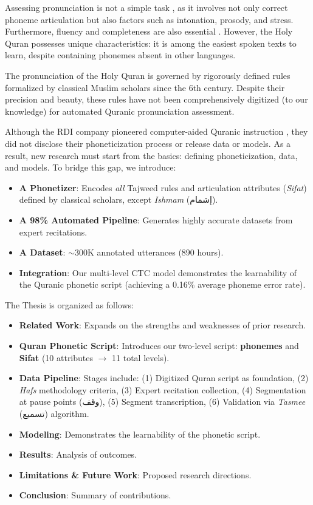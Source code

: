 Assessing pronunciation is not a simple task \cite{kheir2023automatic}, as it involves not only correct phoneme articulation but also factors such as intonation, prosody, and stress. Furthermore, fluency and completeness are also essential \cite{kheir2023automatic}. However, the Holy Quran possesses unique characteristics: it is among the easiest spoken texts to learn, despite containing phonemes absent in other languages.

The pronunciation of the Holy Quran is governed by rigorously defined rules formalized by classical Muslim scholars since the 6th century. Despite their precision and beauty, these rules have not been comprehensively digitized (to our knowledge) for automated Quranic pronunciation assessment.

Although the RDI company pioneered computer-aided Quranic instruction \cite{sherif2007enhancing}, they did not disclose their phoneticization process or release data or models. As a result, new research must start from the basics: defining phoneticization, data, and models. To bridge this gap, we introduce:

\begin{itemize}
\item \textbf{A Phonetizer}: Encodes \textit{all} Tajweed rules and articulation attributes (\textit{Sifat}) defined by classical scholars, except \textit{Ishmam} (إشمام).
\item \textbf{A 98\% Automated Pipeline}: Generates highly accurate datasets from expert recitations.
\item \textbf{A Dataset}: $\sim$300K annotated utterances (890 hours).
\item \textbf{Integration}: Our multi-level CTC model demonstrates the learnability of the Quranic phonetic script (achieving a 0.16\% average phoneme error rate).
\end{itemize}

The Thesis is organized as follows:

\begin{itemize}
\item \textbf{Related Work}: Expands on the strengths and weaknesses of prior research.
\item \textbf{Quran Phonetic Script}: Introduces our two-level script: \textbf{phonemes} and \textbf{Sifat} (10 attributes $\rightarrow$ 11 total levels).
\item \textbf{Data Pipeline}: Stages include:  
  (1) Digitized Quran script as foundation,  
  (2) \textit{Hafs} methodology criteria,  
  (3) Expert recitation collection,  
  (4) Segmentation at pause points (وقف),  
  (5) Segment transcription,  
  (6) Validation via \textit{Tasmee} (تسميع) algorithm.  
\item \textbf{Modeling}: Demonstrates the learnability of the phonetic script.
\item \textbf{Results}: Analysis of outcomes.
\item \textbf{Limitations \& Future Work}: Proposed research directions.
\item \textbf{Conclusion}: Summary of contributions.
\end{itemize}